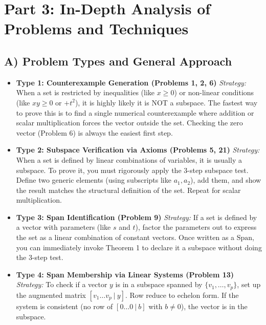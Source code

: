 \documentclass[12pt]{article}
\begin{document}
\newpage

\section{Part 3: In-Depth Analysis of Problems and Techniques}

\subsection{A) Problem Types and General Approach}
\begin{itemize}
    \item \textbf{Type 1: Counterexample Generation (Problems 1, 2, 6)}
    \textit{Strategy:} When a set is restricted by inequalities (like $x \ge 0$) or non-linear conditions (like $xy \ge 0$ or $+ t^2$), it is highly likely it is NOT a subspace. The fastest way to prove this is to find a single numerical counterexample where addition or scalar multiplication forces the vector outside the set. Checking the zero vector (Problem 6) is always the easiest first step.
    
    \item \textbf{Type 2: Subspace Verification via Axioms (Problems 5, 21)}
    \textit{Strategy:} When a set is defined by linear combinations of variables, it is usually a subspace. To prove it, you must rigorously apply the 3-step subspace test. Define two generic elements (using subscripts like $a_1, a_2$), add them, and show the result matches the structural definition of the set. Repeat for scalar multiplication.
    
    \item \textbf{Type 3: Span Identification (Problem 9)}
    \textit{Strategy:} If a set is defined by a vector with parameters (like $s$ and $t$), factor the parameters out to express the set as a linear combination of constant vectors. Once written as a $\text{Span}$, you can immediately invoke Theorem 1 to declare it a subspace without doing the 3-step test.
    
    \item \textbf{Type 4: Span Membership via Linear Systems (Problem 13)}
    \textit{Strategy:} To check if a vector $y$ is in a subspace spanned by $\{v_1, \dots, v_p\}$, set up the augmented matrix $[v_1 \dots v_p \ | \ y]$. Row reduce to echelon form. If the system is consistent (no row of $[0 \dots 0 \ | \ b]$ with $b \neq 0$), the vector is in the subspace.
\end{itemize}
\end{document}
